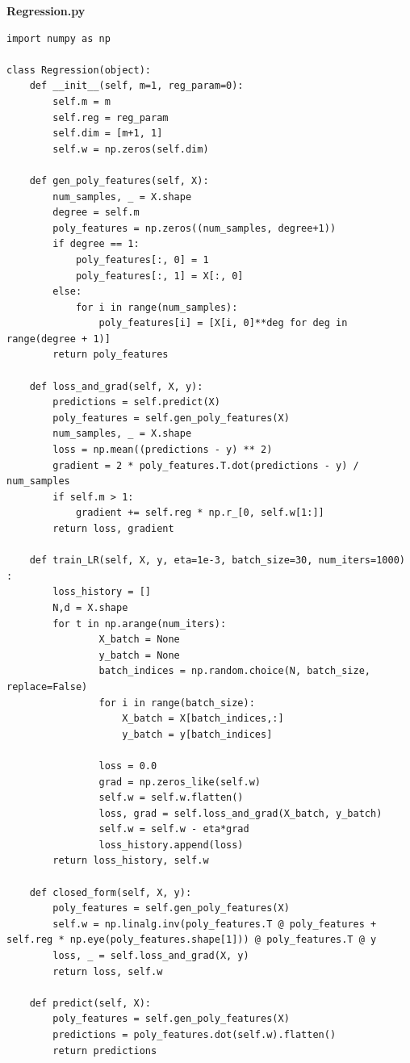 \documentclass[letterpaper]{article}
\theoremstyle{definition}
\begin{document}
\textbf{Regression.py}
\begin{verbatim}
import numpy as np

class Regression(object):
    def __init__(self, m=1, reg_param=0):
        self.m = m
        self.reg = reg_param
        self.dim = [m+1, 1]
        self.w = np.zeros(self.dim)

    def gen_poly_features(self, X):
        num_samples, _ = X.shape
        degree = self.m
        poly_features = np.zeros((num_samples, degree+1))
        if degree == 1:
            poly_features[:, 0] = 1
            poly_features[:, 1] = X[:, 0]
        else:
            for i in range(num_samples):
                poly_features[i] = [X[i, 0]**deg for deg in range(degree + 1)]
        return poly_features
    
    def loss_and_grad(self, X, y):
        predictions = self.predict(X)
        poly_features = self.gen_poly_features(X)
        num_samples, _ = X.shape
        loss = np.mean((predictions - y) ** 2)
        gradient = 2 * poly_features.T.dot(predictions - y) / num_samples
        if self.m > 1:
            gradient += self.reg * np.r_[0, self.w[1:]]
        return loss, gradient

    def train_LR(self, X, y, eta=1e-3, batch_size=30, num_iters=1000) :
        loss_history = []
        N,d = X.shape
        for t in np.arange(num_iters):
                X_batch = None
                y_batch = None
                batch_indices = np.random.choice(N, batch_size, replace=False)
                for i in range(batch_size):
                    X_batch = X[batch_indices,:]
                    y_batch = y[batch_indices]
               
                loss = 0.0
                grad = np.zeros_like(self.w)
                self.w = self.w.flatten()
                loss, grad = self.loss_and_grad(X_batch, y_batch)
                self.w = self.w - eta*grad
                loss_history.append(loss)
        return loss_history, self.w

    def closed_form(self, X, y):
        poly_features = self.gen_poly_features(X)
        self.w = np.linalg.inv(poly_features.T @ poly_features + self.reg * np.eye(poly_features.shape[1])) @ poly_features.T @ y
        loss, _ = self.loss_and_grad(X, y)
        return loss, self.w
    
    def predict(self, X):
        poly_features = self.gen_poly_features(X)
        predictions = poly_features.dot(self.w).flatten()
        return predictions
\end{verbatim}
\end{document}
